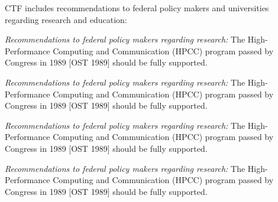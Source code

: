 CTF includes recommendations to federal policy makers and
universities regarding research and education:

\begin{unnumlist}
\item
{\it Recommendations to federal policy makers regarding research:}
The High-Performance Computing and Communication (HPCC)
program passed by Congress in 1989 [OST 1989] should be fully supported.

\item
{\it Recommendations to federal policy makers regarding research:}
The High-Performance Computing and Communication (HPCC)
program passed by Congress in 1989 [OST 1989] should be fully supported.
\item
{\it Recommendations to federal policy makers regarding research:}
The High-Performance Computing and Communication (HPCC)
program passed by Congress in 1989 [OST 1989] should be fully supported.
\item
{\it Recommendations to federal policy makers regarding research:}
The High-Performance Computing and Communication (HPCC)
program passed by Congress in 1989 [OST 1989] should be fully supported.
\end{unnumlist}



